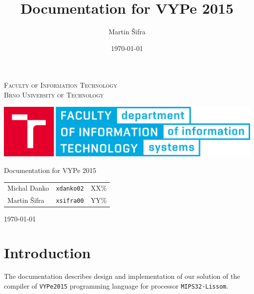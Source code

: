 \documentclass[a4paper, 11pt, titlepage, final]{article}
\title{Documentation for VYPe 2015}
\author{Martin Šifra}
\date{\today}
\begin{document}

\begin{titlepage}
\begin{center}

{\textsc
{\LARGE Faculty of Information Technology \medskip\\
Brno University of Technology}}


{\centering\includegraphics[width=175mm]{img/logo.png}}


{{\Huge Documentation for VYPe 2015}} \bigskip


\end{center}

{\Large
\begin{tabular}{lll}
Michal Danko & \texttt{xdanko02} & XX\% \\
Martin \v{S}ifra & \texttt{xsifra00} & YY\% \\
\end{tabular}
}{\Large \hfill \today}


\end{titlepage}


\pagestyle{plain}
\setcounter{page}{1}

\section{Introduction}

The documentation describes design and implementation of our solution of the compiler of \texttt{VYPe2015} programming language for processor \texttt{MIPS32-Lissom}. 

\end{document}
